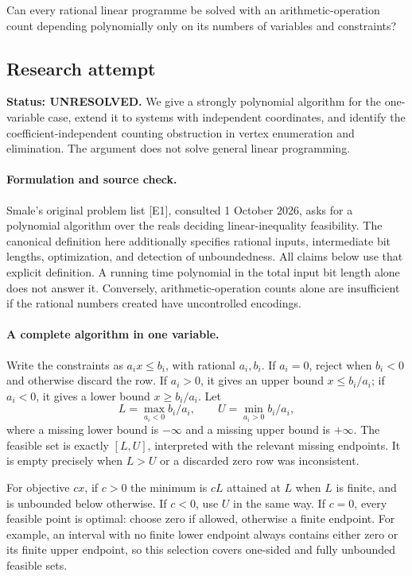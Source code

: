 \documentclass[11pt,a4paper]{article}
\begin{document}
Can every rational linear programme be solved with an arithmetic-operation count depending polynomially only on its numbers of variables and constraints?

\subsection{Research attempt}
\textbf{Status: UNRESOLVED.} We give a strongly polynomial algorithm for the one-variable case, extend it to systems with independent coordinates, and identify the coefficient-independent counting obstruction in vertex enumeration and elimination. The argument does not solve general linear programming.

\paragraph{Formulation and source check.}
Smale's original problem list [E1], consulted 1 October 2026, asks for a polynomial algorithm over the reals deciding linear-inequality feasibility. The canonical definition here additionally specifies rational inputs, intermediate bit lengths, optimization, and detection of unboundedness. All claims below use that explicit definition. A running time polynomial in the total input bit length alone does not answer it. Conversely, arithmetic-operation counts alone are insufficient if the rational numbers created have uncontrolled encodings.

\paragraph{A complete algorithm in one variable.}
Write the constraints as $a_ix\le b_i$, with rational $a_i,b_i$. If $a_i=0$, reject when $b_i<0$ and otherwise discard the row. If $a_i>0$, it gives an upper bound $x\le b_i/a_i$; if $a_i<0$, it gives a lower bound $x\ge b_i/a_i$. Let
\[
L=\max_{a_i<0} b_i/a_i,\qquad U=\min_{a_i>0} b_i/a_i,
\]
where a missing lower bound is $-\infty$ and a missing upper bound is $+\infty$. The feasible set is exactly $[L,U]$, interpreted with the relevant missing endpoints. It is empty precisely when $L>U$ or a discarded zero row was inconsistent.

For objective $cx$, if $c>0$ the minimum is $cL$ attained at $L$ when $L$ is finite, and is unbounded below otherwise. If $c<0$, use $U$ in the same way. If $c=0$, every feasible point is optimal: choose zero if allowed, otherwise a finite endpoint. For example, an interval with no finite lower endpoint always contains either zero or its finite upper endpoint, so this selection covers one-sided and fully unbounded feasible sets.
\end{document}
